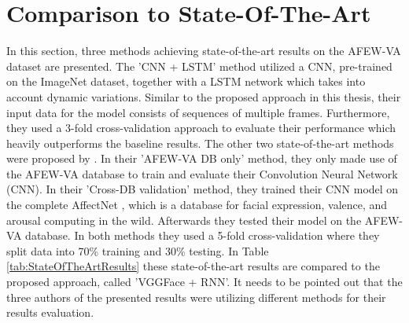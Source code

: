 \section{Comparison to State-Of-The-Art} \label{sec:StateOfTheArtComparison}
In this section, three methods achieving state-of-the-art results on the AFEW-VA dataset are presented. The 'CNN + LSTM' \citep{Theagarajan:2018:DeepDriver} method utilized a CNN, pre-trained on the ImageNet dataset, together with a LSTM network which takes into account dynamic variations. Similar to the proposed approach in this thesis, their input data for the model consists of sequences of multiple frames. Furthermore, they used a 3-fold cross-validation approach to evaluate their performance which heavily outperforms the baseline results.
\newline\newline
The other two state-of-the-art methods were proposed by \citet{Handrich:2020:SimultaneousPredVA}. In their 'AFEW-VA DB only' \citep{Handrich:2020:SimultaneousPredVA} method, they only made use of the AFEW-VA database to train and evaluate their Convolution Neural Network (CNN). In their 'Cross-DB validation' \citep{Handrich:2020:SimultaneousPredVA} method, they trained their CNN model on the complete AffectNet \citep{Mollahosseini:2019:AffectNet}, which is a database for facial expression, valence, and arousal computing in the wild. Afterwards they tested their model on the AFEW-VA database. In both methods they used a 5-fold cross-validation where they split data into 70\% training and 30\% testing.
\newline\newline
In Table \ref{tab:StateOfTheArtResults} these state-of-the-art results are compared to the proposed approach, called 'VGGFace + RNN'. It needs to be pointed out that the three authors of the presented results were utilizing different methods for their results evaluation.

